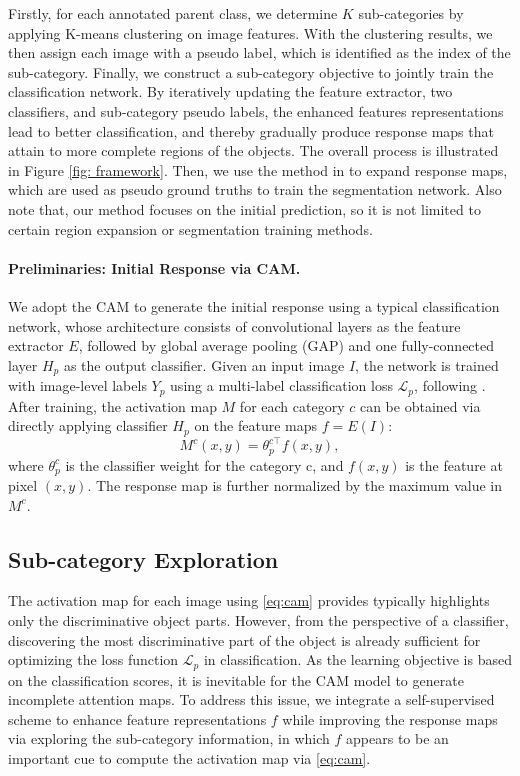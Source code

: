 \documentclass[10pt,twocolumn,letterpaper]{article}
\begin{document}
Firstly, for each annotated parent class, we determine $K$ sub-categories by applying K-means clustering on image features.
With the clustering results, we then assign each image with a pseudo label, which is identified as the index of the sub-category. Finally, we construct a sub-category objective to jointly train the classification network.
By iteratively updating the feature extractor, two classifiers, and sub-category pseudo labels, the enhanced features representations lead to better classification, and thereby gradually produce response maps that attain to more complete regions of the objects. 
The overall process is illustrated in Figure \ref{fig: framework}.
Then, we use the method in \cite{ahn2018learning} to expand response maps, which are used as pseudo ground truths to train the segmentation network.
Also note that, our method focuses on the initial prediction, so it is not limited to certain region expansion or segmentation training methods.


\paragraph{Preliminaries: Initial Response via CAM.}
We adopt the CAM to generate the initial response using a typical classification network, whose architecture consists of convolutional layers as the feature extractor $E$, followed by global average pooling (GAP) and one fully-connected layer $H_p$ as the output classifier.
Given an input image $I$, the network is trained with image-level labels $Y_p$ using a multi-label classification loss $\mathcal{L}_p$, following \cite{zhou2016learning}.
After training, the activation map $M$ for each category $c$ can be obtained via directly applying classifier $H_p$ on the feature maps $f = E(I)$:
\begin{equation}
    M^c(x,y) = \theta_p^{c \top} f(x,y),
    \label{eq:cam}
\end{equation}
where $\theta_p^c$ is the classifier weight for the category c, and $f(x,y)$ is the feature at pixel $(x,y)$. The response map is further normalized by the maximum value in $M^c$.





\subsection{Sub-category Exploration}
The activation map for each image using \eqref{eq:cam} provides typically highlights only the discriminative object parts.
However, from the perspective of a classifier, discovering the most discriminative part of the object is already sufficient for optimizing the loss function $\mathcal{L}_p$ in classification.
As the learning objective is based on the classification scores, it is inevitable for the CAM model to generate 
incomplete attention maps.
To address this issue, we integrate a self-supervised scheme to enhance feature representations $f$ while improving the response maps via exploring the sub-category information, in which $f$ appears to be an important cue to compute the activation map via \eqref{eq:cam}.
\end{document}

